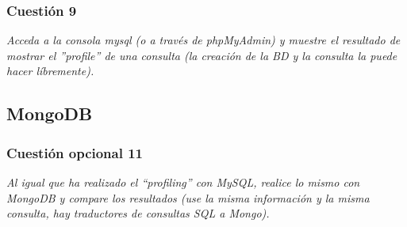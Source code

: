 \subsubsection{Cuestión 9}
\textit{Acceda a la consola mysql (o a través de phpMyAdmin) y muestre el resultado de mostrar el ”profile” de una consulta (la creación de la BD y la consulta la puede hacer líbremente).}
\subsection{MongoDB}
\subsubsection{Cuestión opcional 11}
\textit{Al igual que ha realizado el “profiling” con MySQL, realice lo mismo con MongoDB y compare los resultados (use la misma información y la misma consulta, hay traductores de consultas SQL a Mongo).}

\newpage




